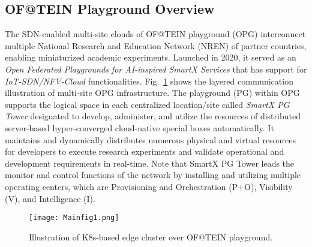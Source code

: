 \documentclass[10pt, conference]{IEEEtran}
\begin{document}
\subsection{OF@TEIN Playground Overview}
\label{sec:k8sedge}
The SDN-enabled multi-site clouds of OF@TEIN playground (OPG) interconnect multiple National Research and Education Network (NREN) of partner countries, enabling miniaturized academic experiments. 
Launched in 2020, it served as an \textit{Open Federated Playgrounds for AI-inspired SmartX Services} that has support for \textit{IoT-SDN/NFV-Cloud} functionalities.
Fig.~\ref{fig:PGInfratructure} shows the layered communication illustration of multi-site OPG infrastructure.
The playground (PG) within OPG supports the logical space in each centralized location/site called \textit{SmartX PG Tower} designated to develop, administer, and utilize the resources of distributed server-based hyper-converged cloud-native special boxes automatically. 
It maintains and dynamically distributes numerous physical and virtual resources for developers to execute research experiments and validate operational and development requirements in real-time.
Note that SmartX PG Tower leads the monitor and control functions of the network by installing and utilizing multiple operating centers, which are Provisioning and Orchestration (P+O), Visibility (V), and Intelligence (I).
\begin{figure}
\centering
\texttt{[image: Mainfig1.png]}
	\caption{Illustration of K8s-based edge cluster over OF@TEIN playground.}
	\label{fig:PGInfratructure}
\vspace{-10pt}	
\end{figure}
\end{document}
